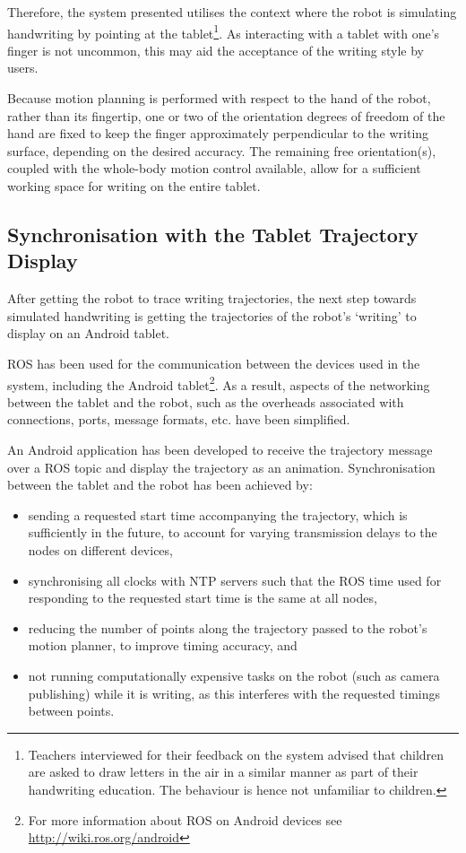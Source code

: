 \documentclass{sig-alternate}
\begin{document}
Therefore, the system presented utilises the context where the robot is
simulating handwriting by pointing at the tablet\footnote{Teachers interviewed
for their feedback on the system advised that children are asked to draw letters
in the air in a similar manner as part of their handwriting education. The behaviour 
is hence not unfamiliar to children.}. As
interacting with a tablet with one's finger is not uncommon, this may aid the
acceptance of the writing style by users. 

Because
motion planning is performed with respect to the hand of the robot, rather than
its fingertip, one or two of the orientation degrees of freedom of the hand
are fixed to keep the finger approximately perpendicular to the writing surface,
depending on the desired accuracy. The remaining free orientation(s), coupled
with the whole-body motion control available, allow for a sufficient working
space for writing on the entire tablet.

\subsection{Synchronisation with the Tablet Trajectory Display}\label{sec:tabletSynch}

After getting the robot to trace writing trajectories, the next step towards
simulated handwriting is getting the trajectories of the robot's `writing' to
display on an Android tablet. 

ROS has been used for the communication between the devices used in the system,
including the Android tablet\footnote{For more information about ROS on Android
devices see \url{http://wiki.ros.org/android}}. As a result, aspects of the
networking between the tablet and the robot, such as the overheads associated
with connections, ports, message formats, etc. have been simplified. 

An Android application has been developed to receive the trajectory message over
a ROS topic and display the trajectory as an
animation. Synchronisation between the tablet and the robot has been achieved by:

\begin{itemize}

    \item sending a requested start time accompanying the trajectory, which is
        sufficiently in the future, to account for varying transmission delays
        to the nodes on different devices,

    \item synchronising all clocks with NTP servers such that the ROS time used
        for responding to the requested start time is the same at all nodes,

    \item reducing the number of points along the trajectory passed to the
        robot's motion planner, to improve timing accuracy, and

    \item not running computationally expensive tasks on the robot (such as
        camera publishing) while it is writing, as this interferes with the
        requested timings between points. 

\end{itemize}
\end{document}
